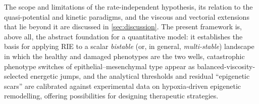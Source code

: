 The scope and limitations of the rate-independent hypothesis, its
relation to the quasi-potential and kinetic paradigms, and the viscous
and vectorial extensions that lie beyond it are discussed in
\cref{sec:discussion}. The present framework is, above all, the
abstract foundation for a quantitative model: it establishes the basis for applying
RIE to a scalar \emph{bistable} (or, in general, \emph{multi-stable}) landscape in
which the healthy and damaged phenotypes are the two wells, catastrophic
phenotype switches of epithelial--mesenchymal type appear as
balanced-viscosity-selected energetic jumps, and the analytical
thresholds and residual ``epigenetic scars'' are calibrated against
experimental data on hypoxia-driven epigenetic remodelling, offering possibilities for designing therapeutic strategies.

\clearpage